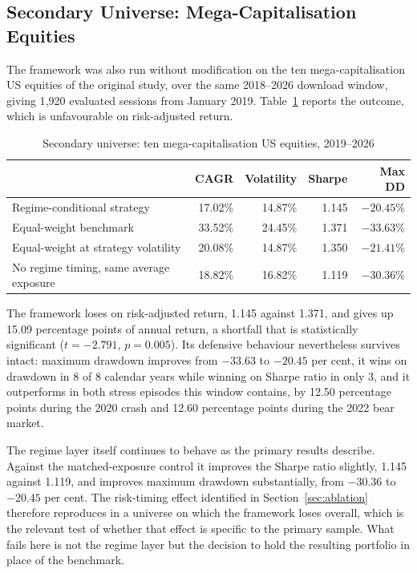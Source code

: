 \documentclass{singlecol-new}
\theoremstyle{TH}{
\newtheorem{lemma}{Lemma}
\newtheorem{theorem}[lemma]{Theorem}
\newtheorem{corrolary}[lemma]{Corrolary}
\newtheorem{conjecture}[lemma]{Conjecture}
\newtheorem{proposition}[lemma]{Proposition}
\newtheorem{claim}[lemma]{Claim}
\newtheorem{stheorem}[lemma]{Wrong Theorem}
\newtheorem{algorithm}{Algorithm}
}
\theoremstyle{THrm}{
\newtheorem{definition}{Definition}[section]
\newtheorem{question}{Question}[section]
\newtheorem{remark}{Remark}
\newtheorem{scheme}{Scheme}
}
\theoremstyle{THhit}{
\newtheorem{case}{Case}[section]
}
\begin{document}
\subsection{Secondary Universe: Mega-Capitalisation Equities}
\label{sec:megacap}

The framework was also run without modification on the ten mega-capitalisation US
equities of the original study, over the same 2018--2026 download window, giving 1{,}920
evaluated sessions from January 2019. Table~\ref{tab:megacap} reports the outcome, which
is unfavourable on risk-adjusted return.

\begin{table}[!ht]
\centering
\caption{Secondary universe: ten mega-capitalisation US equities, 2019--2026}
\label{tab:megacap}
\small
\begin{tabular}{p{4.8cm}rrrr}
\hline
& \textbf{CAGR} & \textbf{Volatility} & \textbf{Sharpe} & \textbf{Max DD} \\
\hline
Regime-conditional strategy & 17.02\% & 14.87\% & 1.145 & $-20.45$\% \\
Equal-weight benchmark & 33.52\% & 24.45\% & 1.371 & $-33.63$\% \\
Equal-weight at strategy volatility & 20.08\% & 14.87\% & 1.350 & $-21.41$\% \\
No regime timing, same average exposure & 18.82\% & 16.82\% & 1.119 & $-30.36$\% \\
\hline
\end{tabular}
\end{table}

The framework loses on risk-adjusted return, 1.145 against 1.371, and gives up 15.09
percentage points of annual return, a shortfall that is statistically significant
($t = -2.791$, $p = 0.005$). Its defensive behaviour nevertheless survives intact:
maximum drawdown improves from $-33.63$ to $-20.45$ per cent, it wins on drawdown in
8 of 8 calendar years while winning on Sharpe ratio in only 3, and it outperforms in
both stress episodes this window contains, by 12.50 percentage points during the 2020
crash and 12.60 percentage points during the 2022 bear market.

The regime layer itself continues to behave as the primary results describe. Against the
matched-exposure control it improves the Sharpe ratio slightly, 1.145 against 1.119, and
improves maximum drawdown substantially, from $-30.36$ to $-20.45$ per cent. The
risk-timing effect identified in Section~\ref{sec:ablation} therefore reproduces in a
universe on which the framework loses overall, which is the relevant test of whether that
effect is specific to the primary sample. What fails here is not the regime layer but the
decision to hold the resulting portfolio in place of the benchmark.
\end{document}
